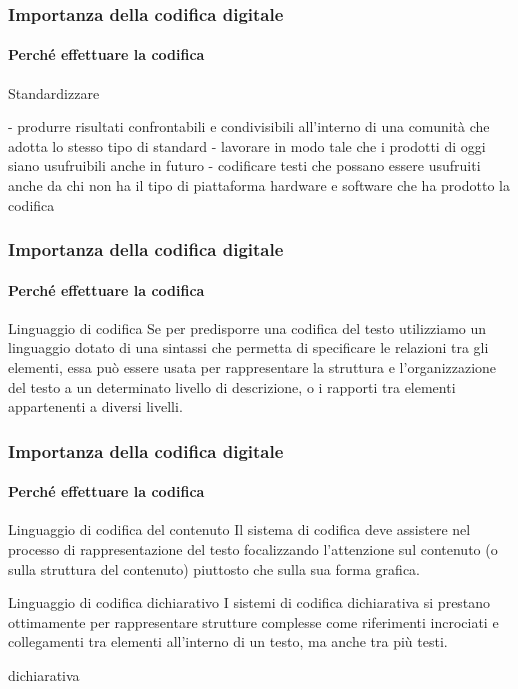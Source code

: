 \begin{frame}
	\frametitle{Importanza della codifica digitale}
	\framesubtitle{Perché effettuare la codifica}
	\addtocounter{nframe}{1}

	\begin{block}{Standardizzare}

		- produrre risultati confrontabili e condivisibili all’interno di
		una comunità che adotta lo stesso tipo di standard
		- lavorare in modo tale che i prodotti di oggi siano
		usufruibili anche in futuro
		- codificare testi che possano essere usufruiti anche da chi
		non ha il tipo di piattaforma hardware e software che ha
		prodotto la codifica
	\end{block}

\end{frame}


\begin{frame}
	\frametitle{Importanza della codifica digitale}
	\framesubtitle{Perché effettuare la codifica}
	\addtocounter{nframe}{1}

	\begin{block}{Linguaggio di codifica}
		Se per predisporre una codifica del testo utilizziamo un linguaggio dotato di una sintassi che permetta di specificare le relazioni tra gli elementi, essa può essere usata per rappresentare la struttura e l’organizzazione del testo a un determinato livello di descrizione, o i rapporti tra elementi appartenenti a diversi livelli.
	\end{block}

\end{frame}

\begin{frame}
	\frametitle{Importanza della codifica digitale}
	\framesubtitle{Perché effettuare la codifica}
	\addtocounter{nframe}{1}

	\begin{block}{Linguaggio di codifica del contenuto}
		Il sistema di codifica deve assistere nel processo di rappresentazione del testo focalizzando l’attenzione sul contenuto (o sulla struttura del contenuto) piuttosto che sulla sua forma grafica.
	\end{block}

	\begin{block}{Linguaggio di codifica dichiarativo}
		I sistemi di codifica dichiarativa si prestano ottimamente per rappresentare strutture complesse come riferimenti incrociati e collegamenti tra elementi all’interno di un testo, ma anche tra più testi.
	\end{block}
	dichiarativa

\end{frame}

